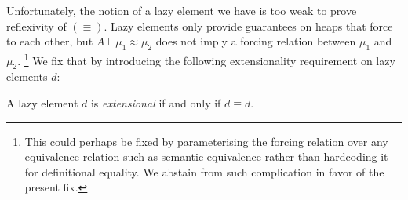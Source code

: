 %

Unfortunately, the notion of a lazy element we have is too weak to prove
reflexivity of $(\equiv)$.
Lazy elements only provide guarantees on heaps that force to each other,
but $A ⊦ μ_1 \approx μ_2$ does not imply a forcing relation between $μ_1$ and $μ_2$.%
\footnote{This could perhaps be fixed by parameterising the forcing relation
over any equivalence relation such as semantic equivalence rather than
hardcoding it for definitional equality. We abstain from such complication in
favor of the present fix.}
We fix that by introducing the following extensionality requirement on lazy
elements $d$:

\begin{definition}[Extensionality]
  A lazy element $d$ is \emph{extensional} if and only if $d \equiv d$.
\end{definition}

